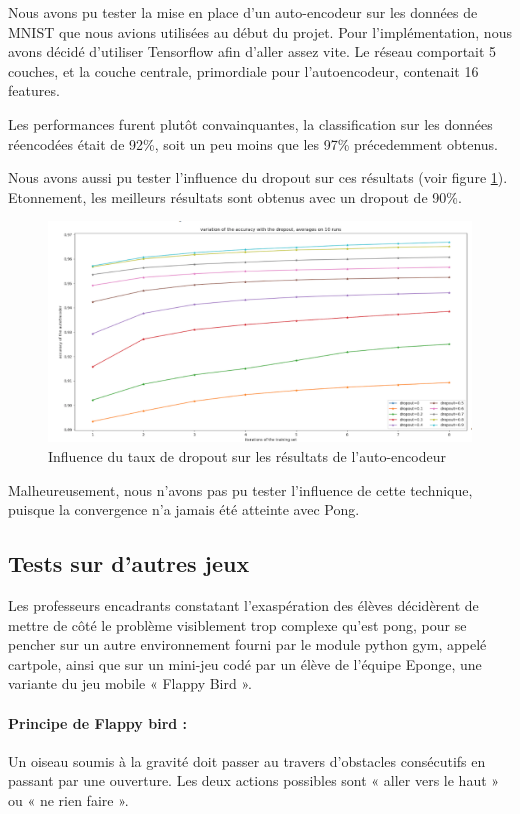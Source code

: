 \documentclass[
    10pt,
    a4paper,
    oneside,
    headinclude,footinclude,
    BCOR=5mm,
    captions=tableabove
]{scrartcl}
\begin{document}
Nous avons pu tester la mise en place d'un auto-encodeur sur les données de MNIST que nous avions utilisées au début du projet. Pour l'implémentation, nous avons décidé d'utiliser Tensorflow afin d'aller assez vite.
Le réseau comportait 5 couches, et la couche centrale, primordiale pour l'autoencodeur, contenait 16 features.

Les performances furent plutôt convainquantes, la classification sur les données réencodées était de 92\%, soit un peu moins que les 97\% précedemment obtenus.

Nous avons aussi pu tester l'influence du dropout sur ces résultats (voir figure \ref{fig:dropout-autoencodeur}). Etonnement, les meilleurs résultats sont obtenus avec un dropout de 90\%.

\begin{figure}
\includegraphics[width=\linewidth]{influence-dropout.png}
\centering
\caption{Influence du taux de dropout sur les résultats de l'auto-encodeur}
\label{fig:dropout-autoencodeur}
\end{figure}

Malheureusement, nous n'avons pas pu tester l'influence de cette technique, puisque la convergence n'a jamais été atteinte avec Pong.

\subsection{Tests sur d'autres jeux}
Les professeurs encadrants constatant l’exaspération des élèves décidèrent de mettre de côté le problème visiblement trop complexe qu’est pong, pour se pencher sur un autre environnement fourni par le module python gym, appelé cartpole, ainsi que sur un mini-jeu codé par un élève de l’équipe Eponge, une variante du jeu mobile « Flappy Bird ».

\paragraph{Principe de Flappy bird :}
Un oiseau soumis à la gravité doit passer au travers d’obstacles consécutifs en passant par une ouverture. Les deux actions possibles sont « aller vers le haut » ou « ne rien faire ».
\end{document}
